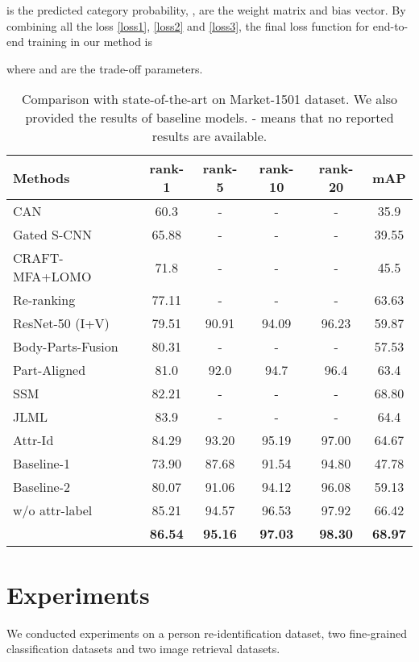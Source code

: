 \documentclass[sigconf]{acmart}
\begin{document}
 is the predicted category probability, ,  are the weight matrix and bias vector. By combining all the loss \eqref{loss1}, \eqref{loss2} and \eqref{loss3}, the final loss function for end-to-end training in our method is

where  and  are the trade-off parameters.



\begin{table*}[!htp]
\renewcommand\arraystretch{1.1}
\centering
\caption{Comparison with state-of-the-art on Market-1501 dataset. We also provided the results of baseline models. - means that no reported results are available.}
\label{table:market-soa}
\begin{tabular}{l|c|c|c|c|c}
\Xhline{1.0pt}
Methods    & rank-1   & rank-5   & rank-10  & rank-20 & mAP   \\ \hline
CAN \cite{liu2017end} & 60.3  & - & - & -   & 35.9 \\
Gated S-CNN \cite{varior2016gated}  & 65.88  & - & - & -   & 39.55\\
CRAFT-MFA+LOMO \cite{chen2017person} & 71.8  & - & - & -   & 45.5 \\
Re-ranking \cite{zhong2017re} & 77.11 & - & - & -   & 63.63 \\
ResNet-50 (I+V) \cite{zheng2016discriminatively}  & 79.51 & 90.91 & 94.09 & 96.23 & 59.87 \\
Body-Parts-Fusion \cite{Li2017Learning} & 80.31  & - & - & -   & 57.53 \\
Part-Aligned \cite{Zhao2017Deeply}  & 81.0 & 92.0 & 94.7 & 96.4 & 63.4 \\
SSM \cite{bai2017scalable}  & 82.21 & - & - & -   & 68.80 \\ 
JLML \cite{ijcai2017-305} & 83.9 & - & - & -   & 64.4 \\
Attr-Id \cite{lin2017improving} & 84.29 & 93.20 & 95.19 & 97.00 & 64.67 \\ \hline
Baseline-1   & 73.90 & 87.68 & 91.54 & 94.80 & 47.78 \\
Baseline-2   & 80.07 & 91.06 & 94.12 & 96.08 & 59.13 \\
 w/o attr-label   & 85.21 & 94.57 & 96.53 & 97.92 & 66.42 \\
  & \textbf{86.54} & \textbf{95.16} & \textbf{97.03} & \textbf{98.30} & \textbf{68.97} \\ \hline
\end{tabular}
\end{table*}

\section{Experiments}
We conducted experiments on a person re-identification dataset, two fine-grained classification datasets and two image retrieval datasets.
\end{document}
